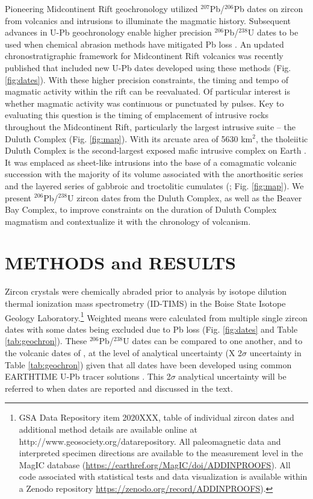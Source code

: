\documentclass[11pt,letterpaper]{article}
\begin{document}
Pioneering Midcontinent Rift geochronology utilized $^{207}$Pb/$^{206}$Pb dates on zircon from volcanics \citep{Davis1997a} and intrusions \citep{Paces1993a} to illuminate the magmatic history. Subsequent advances in U-Pb geochronology enable higher precision $^{206}$Pb/$^{238}$U dates to be used when chemical abrasion methods have mitigated Pb loss \citep{Mattinson2005a}. An updated chronostratigraphic framework for Midcontinent Rift volcanics was recently published \citep{Swanson-Hysell2019a} that included new U-Pb dates developed using these methods (Fig. \ref{fig:dates}). With these higher precision constraints, the timing and tempo of magmatic activity within the rift can be reevaluated. Of particular interest is whether magmatic activity was continuous or punctuated by pulses. Key to evaluating this question is the timing of emplacement of intrusive rocks throughout the Midcontinent Rift, particularly the largest intrusive suite -- the Duluth Complex (Fig. \ref{fig:map}). With its arcuate area of 5630 km$^2$, the tholeiitic Duluth Complex is the second-largest exposed mafic intrusive complex on Earth \citep{Miller2002c}. It was emplaced as sheet-like intrusions into the base of a comagmatic volcanic succession with the majority of its volume associated with the anorthositic series and the layered series of gabbroic and troctolitic cumulates (\citealp{Miller2002c}; Fig. \ref{fig:map}). We present $^{206}$Pb/$^{238}$U zircon dates from the Duluth Complex, as well as the Beaver Bay Complex, to improve constraints on the duration of Duluth Complex magmatism and contextualize it with the chronology of volcanism.

\section*{METHODS and RESULTS}

Zircon crystals were chemically abraded prior to analysis by isotope dilution thermal ionization mass spectrometry (ID-TIMS) in the Boise State Isotope Geology Laboratory.\footnote{GSA Data Repository item 2020XXX, table of individual zircon dates and additional method details are available online at http://www.geosociety.org/datarepository. All paleomagnetic data and interpreted specimen directions are available to the measurement level in the MagIC database (\url{https://earthref.org/MagIC/doi/ADDINPROOFS}).  All code associated with statistical tests and data visualization is available within a Zenodo repository \url{https://zenodo.org/record/ADDINPROOFS}).} Weighted means were calculated from multiple single zircon dates with some dates being excluded due to Pb loss (Fig. \ref{fig:dates} and Table \ref{tab:geochron}). These $^{206}$Pb/$^{238}$U dates can be compared to one another, and to the volcanic dates of \cite{Swanson-Hysell2019a}, at the level of analytical uncertainty (X 2$\sigma$ uncertainty in Table \ref{tab:geochron}) given that all dates have been developed using common EARTHTIME U-Pb tracer solutions \citep{Condon2015a}. This 2$\sigma$ analytical uncertainty will be referred to when dates are reported and discussed in the text.
\end{document}
